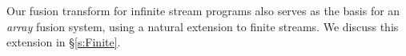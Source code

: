 Our fusion transform for infinite stream programs also serves as the basis for an \emph{array} fusion system, using a natural extension to finite streams. We discuss this extension in \S\ref{s:Finite}.



